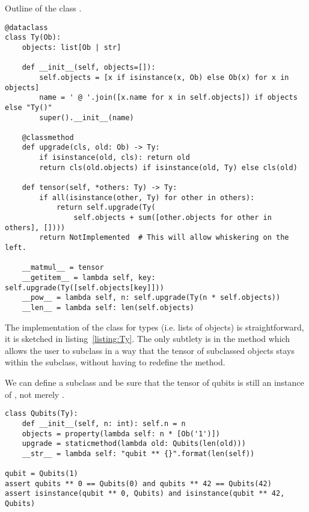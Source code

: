 \begin{python}\label{listing:Ty}
{\normalfont Outline of the class .}
\begin{verbatim}
@dataclass
class Ty(Ob):
    objects: list[Ob | str]

    def __init__(self, objects=[]):
        self.objects = [x if isinstance(x, Ob) else Ob(x) for x in objects]
        name = ' @ '.join([x.name for x in self.objects]) if objects else "Ty()"
        super().__init__(name)

    @classmethod
    def upgrade(cls, old: Ob) -> Ty:
        if isinstance(old, cls): return old
        return cls(old.objects) if isinstance(old, Ty) else cls(old)

    def tensor(self, *others: Ty) -> Ty:
        if all(isinstance(other, Ty) for other in others):
            return self.upgrade(Ty(
                self.objects + sum([other.objects for other in others], [])))
        return NotImplemented  # This will allow whiskering on the left.

    __matmul__ = tensor
    __getitem__ = lambda self, key: self.upgrade(Ty([self.objects[key]]))
    __pow__ = lambda self, n: self.upgrade(Ty(n * self.objects))
    __len__ = lambda self: len(self.objects)
\end{verbatim}
\end{python}

The implementation of the class  for types (i.e. lists of objects) is straightforward, it is sketched in listing~\ref{listing:Ty}.
The only subtlety is in the method  which allows the user to subclass  in a way that the tensor of subclassed objects stays within the subclass, without having to redefine the  method.

\begin{example}
We can define a  subclass and be sure that the tensor of qubits is still an instance of , not merely .

\begin{verbatim}
class Qubits(Ty):
    def __init__(self, n: int): self.n = n
    objects = property(lambda self: n * [Ob('1')])
    upgrade = staticmethod(lambda old: Qubits(len(old)))
    __str__ = lambda self: "qubit ** {}".format(len(self))

qubit = Qubits(1)
assert qubits ** 0 == Qubits(0) and qubits ** 42 == Qubits(42)
assert isinstance(qubit ** 0, Qubits) and isinstance(qubit ** 42, Qubits)
\end{verbatim}
\end{example}

